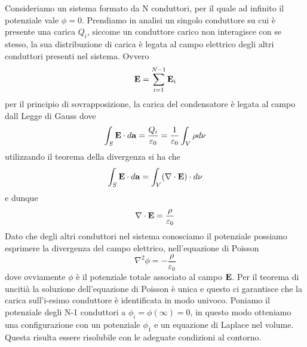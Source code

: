 Consideriamo un sistema formato da N conduttori, per il quale ad infinito il potenziale vale $\phi = 0$. Prendiamo in analisi un singolo conduttore su cui \`e presente una carica $Q_i$, siccome un conduttore carico non interagisce con se stesso, la sua distribuzione di carica \`e legata al campo elettrico degli altri conduttori presenti nel sistema. Ovvero
\begin{equation*}
	\bold{E} = \sum_{i = 1}^{N-1}\bold{E}_i
\end{equation*} 
per il principio di sovrapposizione, la carica del condensatore \`e legata al campo dall Legge di Gauss dove 
\begin{equation*}
	\int_{S} \bold{E} \cdot d\bold{a} = \frac{Q_i}{\varepsilon_0} = \frac{1}{\varepsilon_0}\int_{V} \rho d\nu
\end{equation*}
utilizzando il teorema della divergenza si ha che 
\begin{equation*}
	\int_{S} \bold{E} \cdot d\bold{a}=\int_{V} (\nabla \cdot \bold{E}) \cdot d\nu
\end{equation*}
e dunque 
\begin{equation*}
	\nabla \cdot \bold{E} = \frac{\rho}{\varepsilon_0}
\end{equation*}
Dato che degli altri conduttori nel sistema conosciamo il potenziale possiamo esprimere la divergenza del campo elettrico, nell'equazione di Poisson 
\begin{equation*}
	\nabla^2\phi = - \frac{\rho}{\varepsilon_0}
\end{equation*}
dove ovviamente $\phi$ \`e il potenziale totale associato al campo $\bold{E}$. Per il teorema di unciti\`a la soluzione dell'equazione di Poisson \`e unica e questo ci garantisce che la carica sull'i-esimo conduttore \`e identificata in modo univoco. Poniamo il potenziale degli N-1 conduttori a $\phi_{i} = \phi (\infty) = 0$, in questo modo otteniamo una configurazione con un potenziale $\phi _1$ e un equazione di Laplace nel volume. Questa risulta essere risolubile con le adeguate condizioni al contorno.


